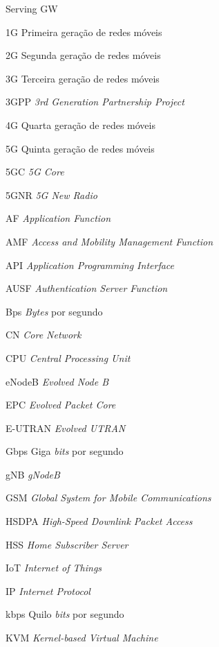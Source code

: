 \documentclass[ecp,tc]{iiufrgs}
\begin{document}
\begin{listofabbrv}{Serving GW}
    \item[1G]       Primeira geração de redes móveis
    \item[2G]       Segunda geração de redes móveis
    \item[3G]       Terceira geração de redes móveis
    \item[3GPP]     \textit{3rd Generation Partnership Project}
    \item[4G]       Quarta geração de redes móveis
    \item[5G]       Quinta geração de redes móveis
    \item[5GC]      \textit{5G Core}
    \item[5GNR]     \textit{5G New Radio}
    \item[AF]       \textit{Application Function}
    \item[AMF]      \textit{Access and Mobility Management Function}
    \item[API]      \textit{Application Programming Interface}
    \item[AUSF]     \textit{Authentication Server Function}
    \item[Bps]      \textit{Bytes} por segundo
    \item[CN]       \textit{Core Network}
    \item[CPU]      \textit{Central Processing Unit}
    \item[eNodeB]   \textit{Evolved Node B}
    \item[EPC]      \textit{Evolved Packet Core}
    \item[E-UTRAN]  \textit{Evolved UTRAN}
    \item[Gbps]     Giga \textit{bits} por segundo
    \item[gNB]      \textit{gNodeB}
    \item[GSM]      \textit{Global System for Mobile Communications}
    \item[HSDPA]    \textit{High-Speed Downlink Packet Access}
    \item[HSS]      \textit{Home Subscriber Server}
    \item[IoT]      \textit{Internet of Things}
    \item[IP]       \textit{Internet Protocol}
    \item[kbps]     Quilo \textit{bits} por segundo
    \item[KVM]      \textit{Kernel-based Virtual Machine}

\end{listofabbrv}
\end{document}
